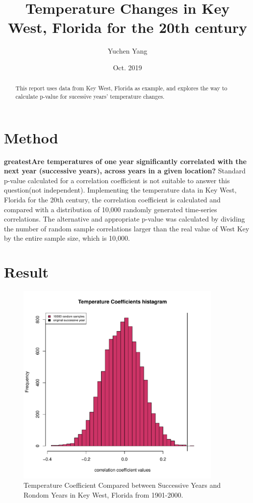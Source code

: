 \documentclass[10pt]{article}
\title{Temperature Changes in Key West, Florida for the 20th century}
\author{Yuchen Yang}
\date{Oct. 2019}
\begin{document}
  \maketitle

  \begin{abstract}
  This report uses data from Key West, Florida as example, and explores the way to calculate p-value for sucessive years' temperature changes.
  \end{abstract}

  \section{Method}
    \textbf{greatestAre temperatures of one year significantly correlated with the next year (successive years), across years in a given location?} Standard p-value calculated for a correlation coefficient is not suitable to answer this question(not independent). Implementing the temperature data in Key West, Florida for the 20th century, the correlation coefficient is calculated and compared with a distribution of 10,000 randomly generated time-series correlations. The alternative and appropriate p-value was calculated by dividing the number of random sample correlations larger than the real value of West Key by the entire sample size, which is 10,000.

  \section{Result}
    \begin{figure}[H]
    \centering
    \includegraphics[width=0.90\textwidth]{../Results/TAutoCorr_graph.pdf}
    \caption{Temperature Coefficient Compared between Successive Years and Rondom Years in Key West, Florida from 1901-2000.}
    \end{figure}
\end{document}
